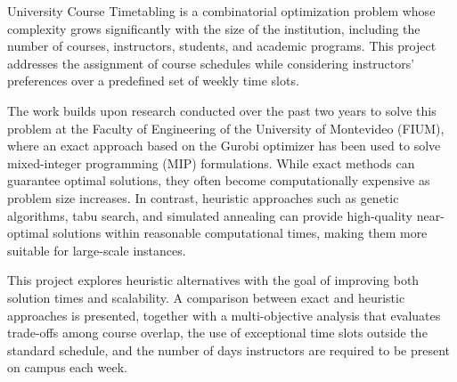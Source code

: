 \begin{foreignabstract}

University Course Timetabling is a combinatorial optimization problem whose complexity grows significantly with the size of the institution, including the number of courses, instructors, students, and academic programs. This project addresses the assignment of course schedules while considering instructors' preferences over a predefined set of weekly time slots.

The work builds upon research conducted over the past two years to solve this problem at the Faculty of Engineering of the University of Montevideo (FIUM), where an exact approach based on the Gurobi optimizer has been used to solve mixed-integer programming (MIP) formulations. While exact methods can guarantee optimal solutions, they often become computationally expensive as problem size increases. In contrast, heuristic approaches such as genetic algorithms, tabu search, and simulated annealing can provide high-quality near-optimal solutions within reasonable computational times, making them more suitable for large-scale instances.

This project explores heuristic alternatives with the goal of improving both solution times and scalability. A comparison between exact and heuristic approaches is presented, together with a multi-objective analysis that evaluates trade-offs among course overlap, the use of exceptional time slots outside the standard schedule, and the number of days instructors are required to be present on campus each week.

\end{foreignabstract}